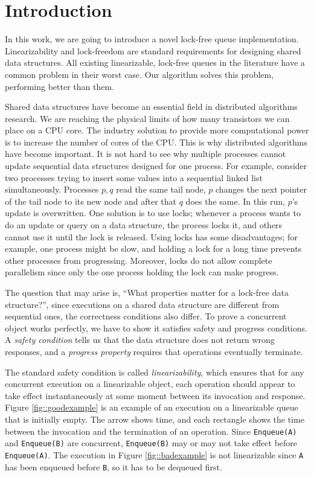 \documentclass[12pt]{article}
\begin{document}
\pagebreak

\section{Introduction}

In this work, we are going to introduce a novel lock-free queue implementation.
Linearizability and lock-freedom are standard requirements for designing shared data structures. All existing linearizable, lock-free queues in the literature have a common problem in their worst case. Our algorithm solves this problem, performing better than them.

Shared data structures have become an essential field in distributed algorithms research.
We are reaching the physical limits of how many transistors we can place on a CPU core. The industry solution to provide more computational power is to increase the number of cores of the CPU. This is why distributed algorithms have become important. It is not hard to see why multiple processes cannot update sequential data structures designed for one process. For example, consider two processes trying to insert some values into a sequential linked list simultaneously. Processes $p,q$ read the same tail node, $p$ changes the next pointer of the tail node to its new node and after that $q$ does the same. In this run, $p$'s update is overwritten. One solution is to use locks; whenever a process wants to do an update or query on a data structure, the process locks it, and others cannot use it until the lock is released. Using locks has some disadvantages; for example, one process might be slow, and holding a lock for a long time prevents other processes from progressing. Moreover, locks do not allow complete parallelism since only the one process holding the lock can make progress. 


The question that may arise is, ``What properties matter for a lock-free data structure?'', since executions on a shared data structure are different from sequential ones, the correctness conditions also differ. To prove a concurrent object works perfectly, we have to show it satisfies safety and progress conditions. A \textit{safety condition} tells us that the data structure does not return wrong responses, and a \textit{progress property} requires that operations eventually terminate.

The standard safety condition is called \textit{linearizability}, which ensures that for any concurrent execution on a linearizable object, each operation should appear to take effect instantaneously at some moment between its invocation and response. Figure \ref{fig::goodexample} is an example of an execution on a linearizable  queue that is initially empty. The arrow shows time, and each rectangle shows the time between the invocation and the termination of an operation. Since \texttt{Enqueue(A)} and \texttt{Enqueue(B)} are concurrent, \texttt{Enqueue(B)} may or may not take effect before \texttt{Enqueue(A)}. The execution in Figure \ref{fig::badexample} is not linearizable since \texttt{A} has been enqueued before \texttt{B}, so it has to be dequeued first.
\end{document}
